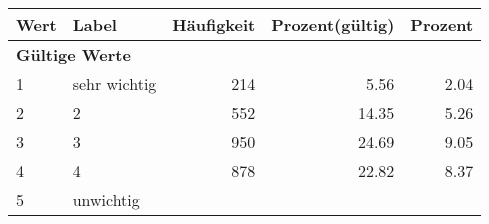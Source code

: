      \begin{longtable}{lXrrr}
     \toprule
     \textbf{Wert} & \textbf{Label} & \textbf{Häufigkeit} & \textbf{Prozent(gültig)} & \textbf{Prozent} \\
     \endhead
     \midrule
     \multicolumn{5}{l}{\textbf{Gültige Werte}}\\

     1 &
     \multicolumn{1}{X}{ sehr wichtig   } &


       \num{214} &
       \num[round-mode=places,round-precision=2]{5.56} &
         \num[round-mode=places,round-precision=2]{2.04} \\

     2 &
     \multicolumn{1}{X}{ 2   } &


       \num{552} &
       \num[round-mode=places,round-precision=2]{14.35} &
         \num[round-mode=places,round-precision=2]{5.26} \\

     3 &
     \multicolumn{1}{X}{ 3   } &


       \num{950} &
       \num[round-mode=places,round-precision=2]{24.69} &
         \num[round-mode=places,round-precision=2]{9.05} \\

     4 &
     \multicolumn{1}{X}{ 4   } &


       \num{878} &
       \num[round-mode=places,round-precision=2]{22.82} &
         \num[round-mode=places,round-precision=2]{8.37} \\

     5 &
     \multicolumn{1}{X}{ unwichtig   } &



\end{longtable}
